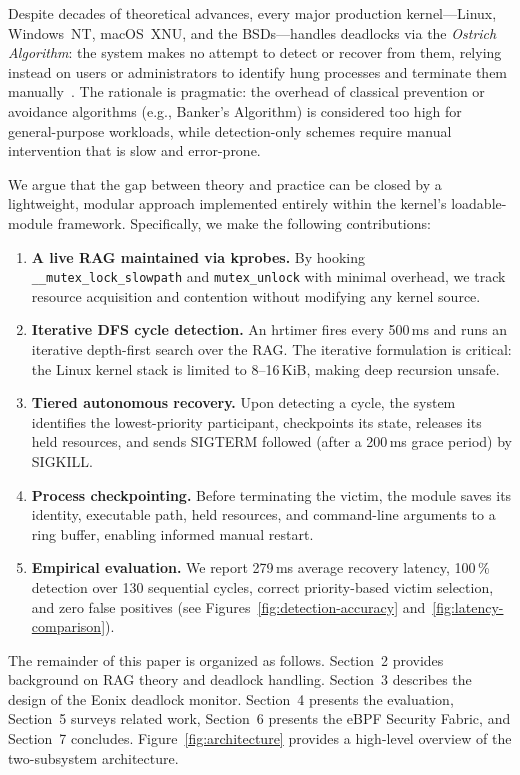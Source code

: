 \documentclass[11pt,letterpaper]{article}
\begin{document}
Despite decades of theoretical advances, every major production
kernel---Linux, Windows~NT, macOS~XNU, and the BSDs---handles deadlocks
via the \emph{Ostrich Algorithm}: the system makes no attempt to detect
or recover from them, relying instead on users or administrators to
identify hung processes and terminate them manually~\cite{tanenbaum2015}.
The rationale is pragmatic: the overhead of classical prevention or
avoidance algorithms (e.g., Banker's Algorithm) is considered too high
for general-purpose workloads, while detection-only schemes require
manual intervention that is slow and error-prone.

We argue that the gap between theory and practice can be closed by a
lightweight, modular approach implemented entirely within the kernel's
loadable-module framework.  Specifically, we make the following
contributions:

\begin{enumerate}
\item \textbf{A live RAG maintained via kprobes.}  By hooking
  \texttt{\_\_mutex\_lock\_slowpath} and \texttt{mutex\_unlock} with
  minimal overhead, we track resource acquisition and contention without
  modifying any kernel source.
\item \textbf{Iterative DFS cycle detection.}  An hrtimer fires every
  500\,ms and runs an iterative depth-first search over the RAG.  The
  iterative formulation is critical: the Linux kernel stack is limited
  to 8--16\,KiB, making deep recursion unsafe.
\item \textbf{Tiered autonomous recovery.}  Upon detecting a cycle, the
  system identifies the lowest-priority participant, checkpoints its
  state, releases its held resources, and sends SIGTERM followed (after
  a 200\,ms grace period) by SIGKILL.
\item \textbf{Process checkpointing.}  Before terminating the victim,
  the module saves its identity, executable path, held resources, and
  command-line arguments to a ring buffer, enabling informed manual
  restart.
\item \textbf{Empirical evaluation.}  We report 279\,ms average
  recovery latency, 100\,\% detection over 130 sequential cycles,
  correct priority-based victim selection, and zero false positives
  (see Figures~\ref{fig:detection-accuracy}
  and~\ref{fig:latency-comparison}).
\end{enumerate}

The remainder of this paper is organized as follows.  Section~2 provides
background on RAG theory and deadlock handling.  Section~3 describes the
design of the Eonix deadlock monitor.  Section~4 presents the
evaluation, Section~5 surveys related work, Section~6 presents the eBPF
Security Fabric, and Section~7 concludes.  Figure~\ref{fig:architecture}
provides a high-level overview of the two-subsystem architecture.
\end{document}
